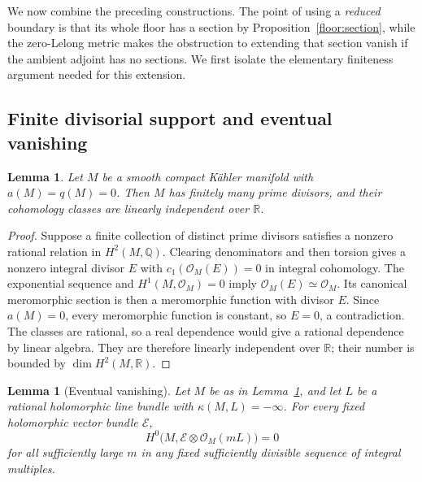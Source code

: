 \documentclass[11pt,letterpaper]{article}
\newcommand{\Q}{\mathbb{Q}}
\newcommand{\R}{\mathbb{R}}
\newcommand{\OO}{\mathcal{O}}
\newtheorem{lemma}[theorem]{Lemma}
\theoremstyle{definition}
\theoremstyle{remark}
\begin{document}
We now combine the preceding constructions. The point of using a
\emph{reduced} boundary is that its whole floor has a section by
Proposition~\ref{floor:section}, while the zero-Lelong metric makes
the obstruction to extending that section vanish if the ambient
adjoint has no sections. We first isolate the elementary finiteness
argument needed for this extension.

\subsection{Finite divisorial support and eventual vanishing}

\begin{lemma}\label{end:finite-primes}
Let \(M\) be a smooth compact K\"ahler manifold with
\(a(M)=q(M)=0\). Then \(M\) has finitely many prime divisors, and
their cohomology classes are linearly independent over \(\R\).
\end{lemma}

\begin{proof}
Suppose a finite collection of distinct prime divisors satisfies a
nonzero rational relation in \(H^2(M,\Q)\). Clearing denominators
and then torsion gives a nonzero integral divisor \(E\) with
\(c_1(\OO_M(E))=0\) in integral cohomology. The exponential
sequence and \(H^1(M,\OO_M)=0\) imply
\(\OO_M(E)\simeq\OO_M\). Its canonical meromorphic section is
then a meromorphic function with divisor \(E\). Since \(a(M)=0\),
every meromorphic function is constant, so \(E=0\), a
contradiction. The classes are rational, so a real dependence would
give a rational dependence by linear algebra. They are therefore
linearly independent over \(\R\); their number is bounded by
\(\dim H^2(M,\R)\).
\end{proof}

\begin{lemma}[Eventual vanishing]\label{end:eventual}
Let \(M\) be as in Lemma~\ref{end:finite-primes}, and let \(L\)
be a rational holomorphic line bundle with \(\kappa(M,L)=-\infty\).
For every fixed holomorphic vector bundle \(\mathcal E\),
\begin{equation}\label{end:fixed-bundle-vanishing}
 H^0\bigl(M,\mathcal E\otimes\OO_M(mL)\bigr)=0
\end{equation}
for all sufficiently large \(m\) in any fixed sufficiently divisible
sequence of integral multiples.
\end{lemma}
\end{document}
